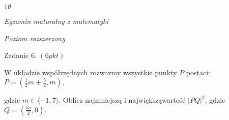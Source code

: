 \documentclass[a4paper,12pt]{article}
\begin{document}
$ 1\theta$

{\it Egzamin maturalny z matematyki}

{\it Poziom rozszerzony}

Zadanie 6. $(6pkt)$

$\mathrm{W}$ układzie współrzędnych rozwazmy wszystkie punkty $P$ postaci: $P=(\displaystyle \frac{1}{2}m+\frac{5}{2},m),$

gdzie $ m\in\langle-1,7\rangle$. Oblicz najmniejszą i największąwartość $|PQ|^{2}$, gdzie $Q=(\displaystyle \frac{55}{2},0).$
\end{document}
